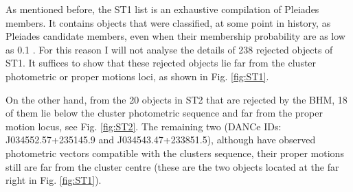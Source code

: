 As mentioned before, the ST1 list is an exhaustive compilation of Pleiades members. It contains objects that were classified, at some point in history, as Pleiades candidate members, even when their membership probability are as low as 0.1 \citep{Stauffer2007}. For this reason I will not analyse the details of 238 rejected objects of ST1. It suffices to show that these rejected objects lie far from the cluster photometric or proper motions loci, as shown in Fig. \ref{fig:ST1}.

On the other hand, from the 20 objects in ST2 that are rejected by the BHM, 18 of them lie below the cluster photometric sequence and far from the proper motion locus, see Fig. \ref{fig:ST2}. The remaining two (DANCe IDs: J034552.57+235145.9 and J034543.47+233851.5), although have observed photometric vectors compatible with the clusters sequence, their proper motions still are far from the cluster centre (these are the two objects located at the far right in Fig. \ref{fig:ST1}).

